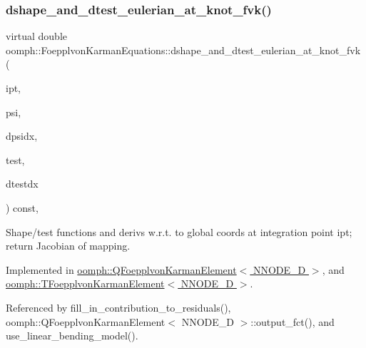 \mbox{\label{classoomph_1_1FoepplvonKarmanEquations_aab91609ffb4a1ae2ae32ef7cb44f887e}} 
\subsubsection{\texorpdfstring{dshape\+\_\+and\+\_\+dtest\+\_\+eulerian\+\_\+at\+\_\+knot\+\_\+fvk()}{dshape\_and\_dtest\_eulerian\_at\_knot\_fvk()}}
{\footnotesize\ttfamily virtual double oomph\+::\+Foepplvon\+Karman\+Equations\+::dshape\+\_\+and\+\_\+dtest\+\_\+eulerian\+\_\+at\+\_\+knot\+\_\+fvk (\begin{DoxyParamCaption}\item[{const unsigned \&}]{ipt,  }\item[{\hyperlink{classoomph_1_1Shape}{Shape} \&}]{psi,  }\item[{\hyperlink{classoomph_1_1DShape}{D\+Shape} \&}]{dpsidx,  }\item[{\hyperlink{classoomph_1_1Shape}{Shape} \&}]{test,  }\item[{\hyperlink{classoomph_1_1DShape}{D\+Shape} \&}]{dtestdx }\end{DoxyParamCaption}) const\hspace{0.3cm}{\ttfamily [protected]}, {}}



Shape/test functions and derivs w.\+r.\+t. to global coords at integration point ipt; return Jacobian of mapping. 



Implemented in \hyperlink{classoomph_1_1QFoepplvonKarmanElement_a405228612fc3349bda3cb6965b740da6}{oomph\+::\+Q\+Foepplvon\+Karman\+Element$<$ N\+N\+O\+D\+E\+\_\+D $>$}, and \hyperlink{classoomph_1_1TFoepplvonKarmanElement_a47009097d667db8345785599cb3bdb81}{oomph\+::\+T\+Foepplvon\+Karman\+Element$<$ N\+N\+O\+D\+E\+\_\+D $>$}.



Referenced by fill\+\_\+in\+\_\+contribution\+\_\+to\+\_\+residuals(), oomph\+::\+Q\+Foepplvon\+Karman\+Element$<$ N\+N\+O\+D\+E\+\_\+D $>$\+::output\+\_\+fct(), and use\+\_\+linear\+\_\+bending\+\_\+model().

